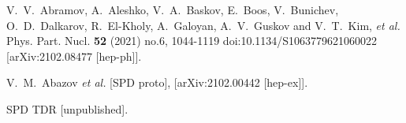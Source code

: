 \documentclass[12pt]{article}
\begin{document}

\begin{thebibliography}{9}
	V.~V.~Abramov, A.~Aleshko, V.~A.~Baskov, E.~Boos, V.~Bunichev, O.~D.~Dalkarov, R.~El-Kholy, A.~Galoyan, A.~V.~Guskov and V.~T.~Kim, \textit{et al.}
	Phys. Part. Nucl. \textbf{52} (2021) no.6, 1044-1119
	doi:10.1134/S1063779621060022
	[arXiv:2102.08477 [hep-ph]].


V.~M.~Abazov \textit{et al.} [SPD proto],
[arXiv:2102.00442 [hep-ex]].

SPD TDR [unpublished].

\end{thebibliography}
\end{document}
